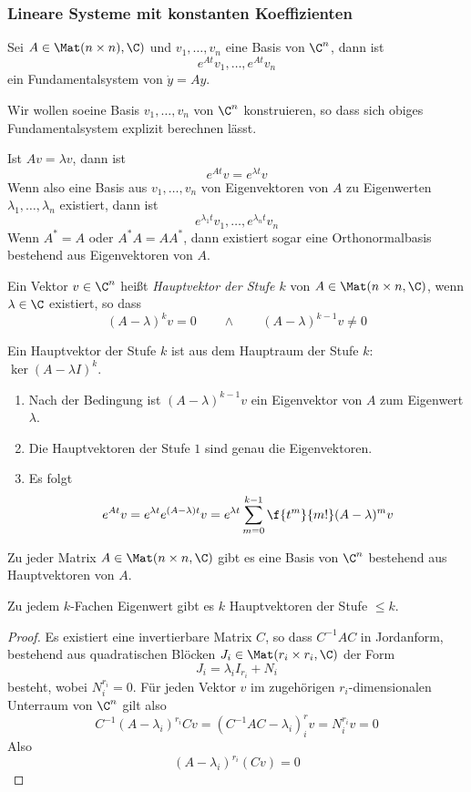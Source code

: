 \documentclass[a4paper,10pt]{scrartcl}
\begin{document}
\subsubsection{Lineare Systeme mit konstanten Koeffizienten}


Sei $A\in \Mat(n\times n),\C)$ und $v_1,\dotsc,v_n$ eine Basis von $\C^n$, dann ist
\[
	e^{At}v_1, \dotsc, e^{At}v_n
\]
ein Fundamentalsystem von $\dot y= Ay$.

Wir wollen soeine Basis $v_1,\dotsc, v_n$ von $\C^n$ konstruieren, so dass sich obiges Fundamentalsystem explizit berechnen lässt.

Ist $Av = \lambda v$, dann ist
\[
	e^{At}v = e^{\lambda t}v
\]
Wenn also eine Basis aus $v_1,\dotsc, v_n$ von Eigenvektoren von $A$ zu Eigenwerten $\lambda_1,\dotsc, \lambda_n$ existiert, dann ist
\[
	e^{\lambda_1 t}v_1, \dotsc, e^{\lambda_n t}v_n
\]
Wenn $A^* = A$ oder $A^*A = AA^*$, dann existiert sogar eine Orthonormalbasis bestehend aus Eigenvektoren von $A$.

\begin{df*}
	Ein Vektor $v\in \C^n$ heißt \emph{Hauptvektor der Stufe $k$} von $A\in \Mat(n\times n,\C)$, wenn $\lambda \in \C$ existiert, so dass
	\[
		(A-\lambda)^kv = 0 \qquad \land \qquad (A-\lambda)^{k-1}v \neq 0
	\]
	\begin{note}
		Ein Hauptvektor der Stufe $k$ ist aus dem Hauptraum der Stufe $k$: $\ker(A-\lambda I)^k$.
	\end{note}
	\begin{note}
		\begin{enumerate}[1)]
			\item
				Nach der Bedingung ist $(A-\lambda)^{k-1}v$ ein Eigenvektor von $A$ zum Eigenwert $\lambda$.
			\item
				Die Hauptvektoren der Stufe $1$ sind genau die Eigenvektoren.
			\item
				Es folgt
				\[
					e^{At}v = e^{\lambda t}e^{(A-\lambda)t}v = e^{\lambda t} \sum_{m=0}^{k-1}\f{t^m}{m!}(A-\lambda)^m v
				\]
		\end{enumerate}
	\end{note}
\end{df*}


\begin{st}
	\label{17.12}
	Zu jeder Matrix $A\in \Mat(n\times n,\C)$ gibt es eine Basis von $\C^n$ bestehend aus Hauptvektoren von $A$.

	Zu jedem $k$-Fachen Eigenwert gibt es $k$ Hauptvektoren der Stufe $\le k$.
	\begin{proof}
		Es existiert eine invertierbare Matrix $C$, so dass $C^{-1}AC$ in Jordanform, bestehend aus quadratischen Blöcken $J_i\in \Mat(r_i\times r_i, \C)$ der Form
		\[
			J_i = \lambda_i I_{r_i} + N_i
		\]
		besteht, wobei $N_i^{r_i} = 0$.
		Für jeden Vektor $v$ im zugehörigen $r_i$-dimensionalen Unterraum von $\C^n$ gilt also
		\[
			C^{-1}(A-\lambda_i)^{r_i}Cv = (C^{-1}AC - \lambda_i)^r_i v = N_i^{r_i}v = 0
		\]
		Also
		\[
			(A-\lambda_i)^{r_i}(Cv) = 0
		\]
	\end{proof}
\end{st}
\end{document}
